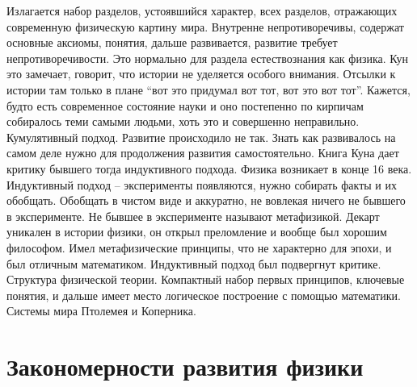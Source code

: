 \documentclass[a4paper, 12pt]{article}
\begin{document}
Излагается набор разделов, устоявшийся характер, всех разделов, 
отражающих современную физическую картину мира. Внутренне 
непротиворечивы, содержат основные аксиомы, понятия, дальше 
развивается, развитие требует непротиворечивости. Это нормально для 
раздела естествознания как физика. Кун это замечает, говорит, что 
истории не уделяется особого внимания. Отсылки к истории там только 
в плане ``вот это придумал вот тот, вот это вот тот''. Кажется, 
будто есть современное состояние науки и оно постепенно по кирпичам 
собиралось теми самыми людьми, хоть это и совершенно неправильно. 
Кумулятивный подход. Развитие происходило не так. Знать как 
развивалось на самом деле нужно для продолжения развития 
самостоятельно. Книга Куна дает критику бывшего тогда индуктивного 
подхода. Физика возникает в конце 16 века. Индуктивный 
подход -- эксперименты появляются, нужно собирать факты и их 
обобщать. Обобщать в чистом виде и аккуратно, не вовлекая ничего не 
бывшего в эксперименте. Не бывшее в эксперименте называют 
метафизикой. Декарт уникален в истории физики, он открыл 
преломление и вообще был хорошим философом. Имел метафизические 
принципы, что не характерно для эпохи, и был отличным математиком. 
Индуктивный подход был подвергнут критике. Структура физической 
теории. Компактный набор первых принципов, ключевые понятия, 
и дальше имеет место логическое построение с помощью математики. 
Системы мира Птолемея и Коперника.


\section{Закономерности развития физики}%
\end{document}
